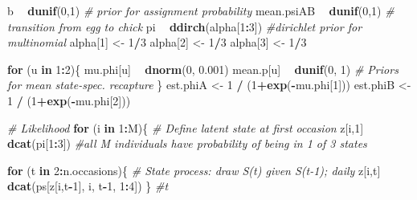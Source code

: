 \documentclass[]{article}
\newenvironment{Shaded}{\begin{snugshade}}{\end{snugshade}}
\newcommand{\KeywordTok}[1]{\textcolor[rgb]{0.13,0.29,0.53}{\textbf{#1}}}
\newcommand{\DecValTok}[1]{\textcolor[rgb]{0.00,0.00,0.81}{#1}}
\newcommand{\FloatTok}[1]{\textcolor[rgb]{0.00,0.00,0.81}{#1}}
\newcommand{\StringTok}[1]{\textcolor[rgb]{0.31,0.60,0.02}{#1}}
\newcommand{\CommentTok}[1]{\textcolor[rgb]{0.56,0.35,0.01}{\textit{#1}}}
\newcommand{\ControlFlowTok}[1]{\textcolor[rgb]{0.13,0.29,0.53}{\textbf{#1}}}
\newcommand{\OperatorTok}[1]{\textcolor[rgb]{0.81,0.36,0.00}{\textbf{#1}}}
\newcommand{\NormalTok}[1]{#1}
\begin{document}
\begin{Shaded}
\begin{Highlighting}[]
\NormalTok{b }\OperatorTok{~}\StringTok{ }\KeywordTok{dunif}\NormalTok{(}\DecValTok{0}\NormalTok{,}\DecValTok{1}\NormalTok{)            }\CommentTok{# prior for assignment probability}
\NormalTok{mean.psiAB }\OperatorTok{~}\StringTok{ }\KeywordTok{dunif}\NormalTok{(}\DecValTok{0}\NormalTok{,}\DecValTok{1}\NormalTok{)   }\CommentTok{# transition from egg to chick}
\NormalTok{pi }\OperatorTok{~}\StringTok{ }\KeywordTok{ddirch}\NormalTok{(alpha[}\DecValTok{1}\OperatorTok{:}\DecValTok{3}\NormalTok{])   }\CommentTok{#dirichlet prior for multinomial}
\NormalTok{alpha[}\DecValTok{1}\NormalTok{] <-}\StringTok{ }\DecValTok{1}\OperatorTok{/}\DecValTok{3}
\NormalTok{alpha[}\DecValTok{2}\NormalTok{] <-}\StringTok{ }\DecValTok{1}\OperatorTok{/}\DecValTok{3}
\NormalTok{alpha[}\DecValTok{3}\NormalTok{] <-}\StringTok{ }\DecValTok{1}\OperatorTok{/}\DecValTok{3}

\ControlFlowTok{for}\NormalTok{ (u }\ControlFlowTok{in} \DecValTok{1}\OperatorTok{:}\DecValTok{2}\NormalTok{)\{}
\NormalTok{ mu.phi[u] }\OperatorTok{~}\StringTok{ }\KeywordTok{dnorm}\NormalTok{(}\DecValTok{0}\NormalTok{, }\FloatTok{0.001}\NormalTok{) }
\NormalTok{ mean.p[u] }\OperatorTok{~}\StringTok{ }\KeywordTok{dunif}\NormalTok{(}\DecValTok{0}\NormalTok{, }\DecValTok{1}\NormalTok{)      }\CommentTok{# Priors for mean state-spec. recapture}
\NormalTok{\}}
\NormalTok{est.phiA <-}\StringTok{ }\DecValTok{1} \OperatorTok{/}\StringTok{ }\NormalTok{(}\DecValTok{1}\OperatorTok{+}\KeywordTok{exp}\NormalTok{(}\OperatorTok{-}\NormalTok{mu.phi[}\DecValTok{1}\NormalTok{]))}
\NormalTok{est.phiB <-}\StringTok{ }\DecValTok{1} \OperatorTok{/}\StringTok{ }\NormalTok{(}\DecValTok{1}\OperatorTok{+}\KeywordTok{exp}\NormalTok{(}\OperatorTok{-}\NormalTok{mu.phi[}\DecValTok{2}\NormalTok{]))}

\CommentTok{# Likelihood }
\ControlFlowTok{for}\NormalTok{ (i }\ControlFlowTok{in} \DecValTok{1}\OperatorTok{:}\NormalTok{M)\{}
 \CommentTok{# Define latent state at first occasion}
\NormalTok{  z[i,}\DecValTok{1}\NormalTok{] }\OperatorTok{~}\StringTok{ }\KeywordTok{dcat}\NormalTok{(pi[}\DecValTok{1}\OperatorTok{:}\DecValTok{3}\NormalTok{])      }\CommentTok{#all M individuals have probability of being in 1 of 3 states}

 \ControlFlowTok{for}\NormalTok{ (t }\ControlFlowTok{in} \DecValTok{2}\OperatorTok{:}\NormalTok{n.occasions)\{}
  \CommentTok{# State process: draw S(t) given S(t-1); daily}
\NormalTok{  z[i,t] }\OperatorTok{~}\StringTok{ }\KeywordTok{dcat}\NormalTok{(ps[z[i,t}\OperatorTok{-}\DecValTok{1}\NormalTok{], i, t}\OperatorTok{-}\DecValTok{1}\NormalTok{, }\DecValTok{1}\OperatorTok{:}\DecValTok{4}\NormalTok{])}
\NormalTok{ \} }\CommentTok{#t}
   

\end{Highlighting}
\end{Shaded}
\end{document}
